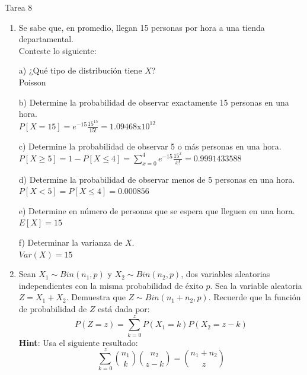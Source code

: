 \documentclass[a4paper, 12pt]{article}
\newcommand{\Aspace}{0.2cm}
\begin{document}
\newpage
\begin{center}
    { \LARGE Tarea 8}
\end{center}

\begin{enumerate}
    \item Se sabe que, en promedio, llegan 15 personas por hora a una tienda departamental.
    \\ Conteste lo siguiente:
    \vspace{\Aspace} \par
    a) ¿Qué tipo de distribución tiene $X$?
    \\ { \color{azul} Poisson }

    \vspace{\Aspace} \par
    b) Determine la probabilidad de observar exactamente 15 personas en una hora.
    \\ { \color{azul} $P[X = 15] = e^{-15} \frac{15^{15}}{15!} = 1{.}09468$x$10^{12}$ }

    \vspace{\Aspace} \par
    c) Determine la probabilidad de observar 5 o más personas en una hora.
    \\ { \color{azul} $P[X \geq 5] = 1 - P[X \leq 4] = \sum\limits_{x = 0}^{4} e^{-15} \frac{15^{x}}{x!} = 0{.}9991433588$ }

    \vspace{\Aspace} \par
    d) Determine la probabilidad de observar menos de 5 personas en una hora.
    \\ { \color{azul} $P[X < 5] = P[X \leq 4] = 0{.}000856$ }

    \vspace{\Aspace} \par
    e) Determine en número de personas que se espera que lleguen en una hora.
    \\ { \color{azul} $E[X] = 15$ }

    \vspace{\Aspace} \par
    f) Determinar la varianza de $X$.
    \\ { \color{azul} $Var(X) = 15$ }


    \item Sean $X_{1} \sim Bin(n_{1}, p)$ y $X_{2} \sim Bin(n_{2}, p)$, dos variables aleatorias independientes con la misma probabilidad de éxito $p$.  
    Sea la variable aleatoria $Z = X_{1} + X_{2}$. Demuestra que $Z \sim Bin(n_{1} + n_{2}, p)$.  
    Recuerde que la función de probabilidad de $Z$ está dada por:
    \[
        P(Z = z) = \sum_{k = 0}^{z} P(X_{1} = k) P(X_{2} = z - k)
    \]
    \textbf{Hint}: Usa el siguiente resultado:
    \[
        \sum_{k = 0}^{z} \binom{n_{1}}{k} \binom{n_{2}}{z - k} = \binom{n_{1} + n_{2}}{z}
    \]
    \vspace{\Aspace} \par
    { \color{azul}  }



\end{enumerate}
\end{document}
